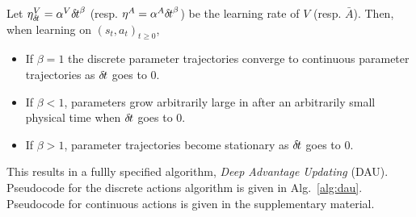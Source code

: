 \begin{theorem}
	Let $\eta^V_{\delta\hspace{-.1em}t} = \alpha^V {\delta\hspace{-.1em}t}^\beta$ (resp. $\eta^A = \alpha^A {\delta\hspace{-.1em}t}^\beta$) be the learning rate
	of $V$ (resp. $\bar{A}$). Then, when learning on $(s_t, a_t)_{t\geq 0}$, 
	\begin{itemize}
		\item If $\beta = 1$ the discrete parameter trajectories converge to continuous parameter
			trajectories as ${\delta\hspace{-.1em}t}$ goes to $0$.
		\item If $\beta < 1$, parameters grow arbitrarily large in after an arbitrarily small physical time when ${\delta\hspace{-.1em}t}$ goes to $0$. 
		\item If $\beta > 1$, parameter trajectories become
		stationary as
			${\delta\hspace{-.1em}t}$ goes to $0$.
	\end{itemize}
	\label{th:cont-params}
\end{theorem}


This results in a fullly specified algorithm,
\emph{Deep Advantage Updating} (DAU).
Pseudocode for the discrete actions algorithm is given in Alg.~\ref{alg:dau}.
Pseudocode for continuous actions is given in the supplementary
material.

